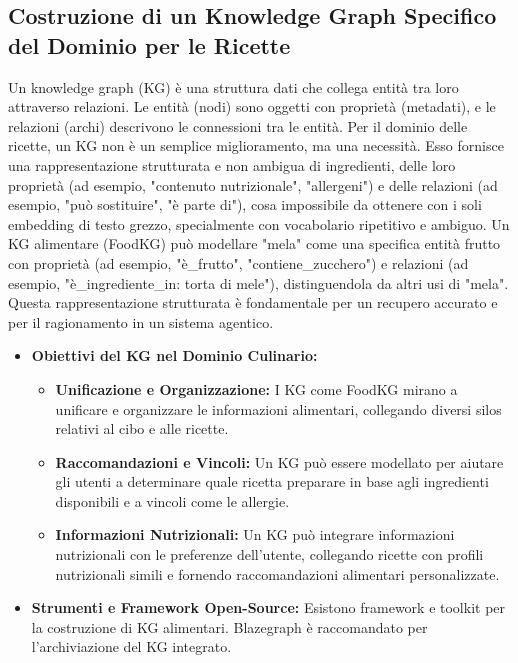 \documentclass[a4paper, 11pt]{article}
\begin{document}
\subsection{Costruzione di un Knowledge Graph Specifico del Dominio per le Ricette}
Un knowledge graph (KG) è una struttura dati che collega entità tra loro attraverso relazioni. \cite{understanding_kg} Le entità (nodi) sono oggetti con proprietà (metadati), e le relazioni (archi) descrivono le connessioni tra le entità. \cite{understanding_kg} Per il dominio delle ricette, un KG non è un semplice miglioramento, ma una necessità. Esso fornisce una rappresentazione strutturata e non ambigua di ingredienti, delle loro proprietà (ad esempio, "contenuto nutrizionale", "allergeni") e delle relazioni (ad esempio, "può sostituire", "è parte di"), cosa impossibile da ottenere con i soli embedding di testo grezzo, specialmente con vocabolario ripetitivo e ambiguo. Un KG alimentare (FoodKG) può modellare "mela" come una specifica entità frutto con proprietà (ad esempio, "è\_frutto", "contiene\_zucchero") e relazioni (ad esempio, "è\_ingrediente\_in: torta di mele"), distinguendola da altri usi di "mela". Questa rappresentazione strutturata \cite{understanding_kg} è fondamentale per un recupero accurato e per il ragionamento in un sistema agentico.
\begin{itemize}
    \item \textbf{Obiettivi del KG nel Dominio Culinario:}
    \begin{itemize}
        \item \textbf{Unificazione e Organizzazione:} I KG come FoodKG mirano a unificare e organizzare le informazioni alimentari, collegando diversi silos relativi al cibo e alle ricette. \cite{foodkg}
        \item \textbf{Raccomandazioni e Vincoli:} Un KG può essere modellato per aiutare gli utenti a determinare quale ricetta preparare in base agli ingredienti disponibili e a vincoli come le allergie. \cite{foodkg}
        \item \textbf{Informazioni Nutrizionali:} Un KG può integrare informazioni nutrizionali con le preferenze dell'utente, collegando ricette con profili nutrizionali simili e fornendo raccomandazioni alimentari personalizzate. \cite{nutrition_kg_recommendation}
    \end{itemize}
    \item \textbf{Strumenti e Framework Open-Source:} Esistono framework e toolkit per la costruzione di KG alimentari. \cite{foodkg} Blazegraph è raccomandato per l'archiviazione del KG integrato. \cite{foodkg}
\end{itemize}
\end{document}
